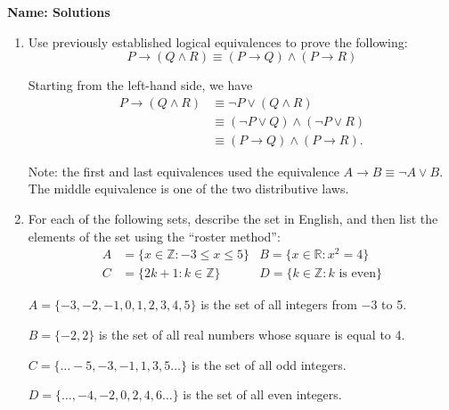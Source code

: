 \documentclass[12pt]{article}
\newcommand{\points}[1]{\marginpar{\hspace{24pt}[#1]}}
\newcommand{\R}{\mathbb{R}}
\newcommand{\Z}{\mathbb{Z}}
\begin{document}
{\bf Name: Solutions}
\thispagestyle{fancy}

 \begin{enumerate}
 \item  Use previously established logical equivalences to prove the following:\points{6}
\[
 P\to (Q\wedge R)\equiv (P\to Q)\wedge (P\to R)
\]

\bigskip

Starting from the left-hand side, we have
\begin{align*}
P \to (Q\wedge R)& \equiv \neg P\vee(Q\wedge R)\\
&\equiv (\neg P\vee Q)\wedge (\neg P\vee R)\\
&\equiv (P\to Q)\wedge (P\to R).
\end{align*}

Note: the first and last equivalences used the equivalence $A\to B\equiv \neg A\vee B$. The middle equivalence is one of the two distributive laws.

\bigskip

\item For each of the following sets, describe the set in English, and then list the elements of the set using the ``roster method'':
\begin{align*}
 A &= \{x\in \mathbb{Z} : -3\leq x\leq 5\}  & B = \{x\in\R : x^2=4\}\\
 C &= \{2k+1 : k\in \Z\} & D = \{k\in\mathbb{Z} : k \text{ is even}\}
\end{align*}

\bigskip

$A = \{-3,-2,-1,0,1,2,3,4,5\}$ is the set of all integers from $-3$ to 5.

$B = \{-2,2\}$ is the set of all real numbers whose square is equal to 4.

$C = \{\ldots -5,-3,-1,1,3,5\ldots\}$ is the set of all odd integers.

$D = \{\ldots, -4,-2,0,2,4,6\ldots\}$ is the set of all even integers.
 \end{enumerate}
\end{document}
